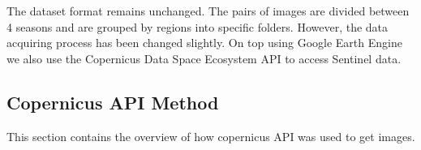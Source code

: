 The dataset format remains unchanged. The pairs of images are divided between 4 seasons and are grouped by regions into specific folders. However, the data acquiring process has been changed slightly. On top using Google Earth Engine\cite{GORELICK201718} we also use the Copernicus Data Space Ecosystem API to access Sentinel data.

\subsection{Copernicus API Method}
This section contains the overview of how copernicus API was used to get images.